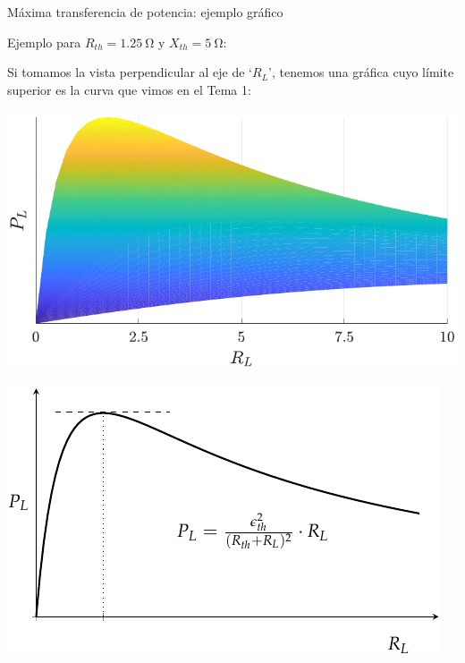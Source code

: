 \documentclass[aspectratio=169, usenames,svgnames,dvipsnames]{beamer}
\begin{document}
\begin{frame}{Máxima transferencia de potencia: \hspace{3mm}ejemplo gráfico}

Ejemplo para $R_{th}=\qty{1,25}{\ohm}$ y $X_{th}=\qty{5}{\ohm}$:

\vspace{3mm}

Si tomamos la \alert{vista perpendicular al eje de `$R_L$'}, tenemos una gráfica cuyo límite superior es la curva que vimos en el Tema 1:

    \vspace{1mm}
    
    \begin{minipage}[c]{0.48\linewidth}
        \vspace{5mm}
        \begin{center}
            \includegraphics[height=0.48\textheight]{../figs/max_pot_Z_L_soloRL.pdf}
        \end{center}
    \end{minipage}
    \hfill%
    \begin{minipage}[c]{0.48\linewidth}
        \begin{center}
            \includegraphics[height=0.52\textheight]{../figs/max_pot_R_L_2.pdf}
        \end{center}
    \end{minipage}
\end{frame}
\end{document}
